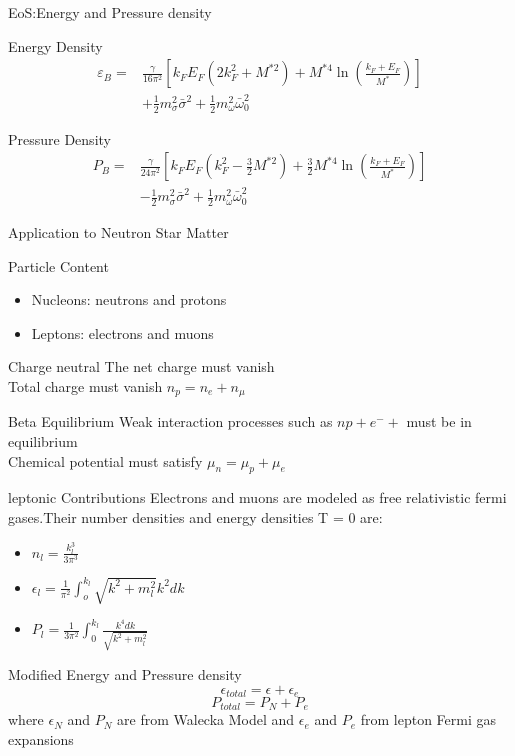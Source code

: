 \documentclass[12pt,aspectratio169]{beamer}
\begin{document}
\begin{frame}{EoS:Energy and Pressure density}
    \begin{block}{Energy Density}
        \begin{align*}
            \varepsilon_B =& \frac{\gamma}{16\pi^2} \left[
k_F E_F (2k_F^2 + M^{*2}) + M^{*4} \ln \left( \frac{k_F + E_F}{M^*} \right)
\right] \\& + \frac{1}{2} m_\sigma^2 \bar{\sigma}^2 + \frac{1}{2} m_\omega^2 \bar{\omega}_0^2
        \end{align*} 
    \end{block}
    \begin{block}{Pressure Density}
        \begin{align*}
    P_B =& \frac{\gamma}{24\pi^2} \left[
k_F E_F \left(k_F^2 - \frac{3}{2} M^{*2} \right) + \frac{3}{2} M^{*4} \ln \left( \frac{k_F + E_F}{M^*} \right)
\right] \\& - \frac{1}{2} m_\sigma^2 \bar{\sigma}^2 + \frac{1}{2} m_\omega^2 \bar{\omega}_0^2   
        \end{align*}
    \end{block}
\end{frame}
\begin{frame}[allowframebreaks]{Application to Neutron Star Matter}
\begin{block}{Particle Content}
    \begin{itemize}
        \item Nucleons: neutrons and protons
        \item Leptons: electrons and muons
    \end{itemize}
\end{block}
\begin{block}{Charge neutral}
    The net charge must vanish\\
    Total charge must vanish $n_p = n_e + n_\mu$
\end{block}
\begin{block}{Beta Equilibrium}
    Weak interaction processes such as $n p + e^- +$ must be in equilibrium\\
    Chemical potential must satisfy $\mu_n = \mu_p + \mu_e$
\end{block}
\begin{block}{leptonic Contributions}
Electrons and muons are modeled as free relativistic fermi gases.Their number densities and energy densities T = 0 are:
\begin{itemize}
    \item $n_l = \frac{k^3_l}{3\pi^3}$
    \item $\epsilon_l = \frac{1}{\pi^2}\int_o^{k_l}\sqrt{k^2 + m^2_l}k^2dk$
    \item $P_l=\frac{1}{3\pi^2}\int_0^{k_l}\frac{k^4 dk}{\sqrt{k^2 + m^2_l}}$
\end{itemize}
\end{block}
\begin{block}{Modified Energy and Pressure density}
   $$\epsilon_{total} = \epsilon + \epsilon_e$$
    $$P_{total} = P_N + P_e$$
    where $\epsilon_N$ and ${P_N}$ are from Walecka Model and $\epsilon_e$ and $P_e$ from lepton Fermi gas expansions
\end{block}

\end{frame}
\end{document}
